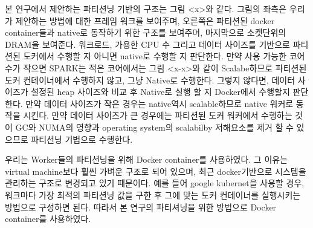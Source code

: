 \ifkor
본 연구에서 제안하는 파티션닝 기반의 구조는 그림 <x>와 같다.
그림의 좌측은 우리가 제안하는 방법에 대한 프레임 워크를 보여주며, 오른쪽은 
파티션된 docker container들과 native로 동작하기 위한 구조를 보여주며, 마지막으로
소켓단위의 DRAM을 보여준다.
워크로드, 가용한 CPU 수 그리고 데이터 사이즈를 기반으로 파티션된 도커에서 수행할 지
아니면 native로 수행할 지 판단한다.
만약 사용 가능한 코어수가 작으면 SPARK는 적은 코어에서는 그림 <x-x>와 같이
Scalabe하므로 파티션된 도커 컨테이너에서 수행하지 않고, 그냥 Native로 수행한다.
그렇지 않다면, 데이터 사이즈가 설정된 heap 사이즈와 비교 후 Native로 실행 할 지
Docker에서 수행할지 판단한다.
만약 데이터 사이즈가 작은 경우는 native역시 scalable하므로 native 워커로 동작을 시킨다.
만약 데이터 사이즈가 큰 경우에는 파티션된 도커 워커에서 수행하는 것이 GC와 
NUMA의 영향과 operating system의 scalabilby 저해요소를 제거 할 수 있으므로 
파티션닝 기법으로 수행한다.
\else

\fi


\ifkor
우리는 Worker들의 파티션닝을 위해 Docker container를 사용하였다. 
그 이유는 virtual machine보다 훨씬 가벼운 구조로 되어 있으며, 
최근 docker기반으로 시스템을 관리하는 구조로 변경되고 있기 때문이다.
예를 들어 google kubernet을 사용할 경우, 워크마다 가장 최적의 파티션닝 값을 구한 후
그에 맞는 도커 컨테이너를 실행시키는 방법으로 구성하면 된다.
따라서 본 연구의 파티셔닝을 위한 방법으로 Docker container를 사용하였다.
\else

\fi


